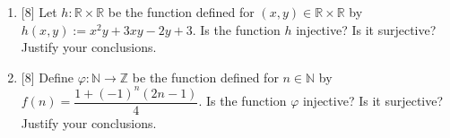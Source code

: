 \documentclass[12pt]{article}
\newcommand{\NN}{{\mathbb N}}
\newcommand{\RR}{{\mathbb R}}
\newcommand{\ZZ}{{\mathbb Z}}
\begin{document}
\begin{enumerate}
\item{[8]}  Let $h\colon\RR\times\RR$ be the function defined for $(x,y)\in\RR\times\RR$  by
        $h(x,y):=x^2y+3xy-2y+3$.
       Is the function $h$ injective?   Is it surjective?   Justify your conclusions.


\item{[8]} Define $\varphi\colon \NN\to\ZZ$ be the function defined for $n\in\NN$ by $f(n)=\dfrac{1+(-1)^n(2n-1)}{4}$.
       Is the function $\varphi$ injective?   Is it surjective?   Justify your conclusions.





\end{enumerate}
\end{document}
